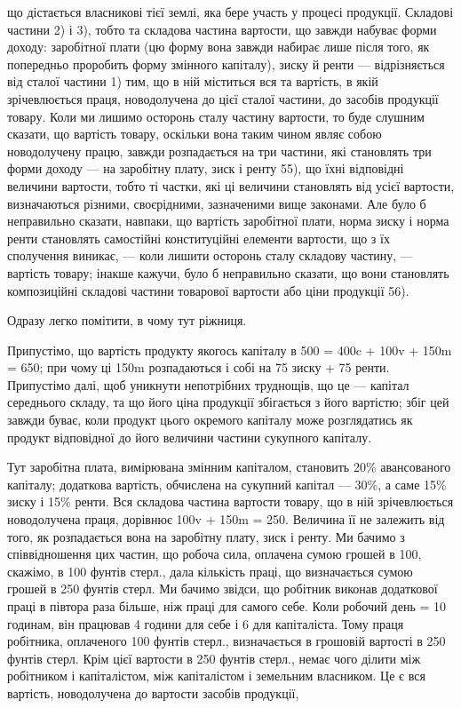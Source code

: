 що дістається власникові тієї землі, яка бере участь у процесі продукції. Складові
частини 2) і 3), тобто та складова частина вартости, що завжди набуває
форми доходу: заробітної плати (цю форму вона завжди набирає лише після
того, як попередньо проробить форму змінного капіталу), зиску й ренти —
відрізняється від сталої частини 1) тим, що в ній міститься вся та вартість, в
якій зрічевлюється праця, новодолучена до цієї сталої частини, до засобів продукції
товару. Коли ми лишимо осторонь сталу частину вартости, то буде слушним
сказати, що вартість товару, оскільки вона таким чином являє собою новодолучену
працю, завжди розпадається на три частини, які становлять три форми
доходу — на заробітну плату, зиск і ренту 55), що їхні відповідні величини вартости,
тобто ті частки, які ці величини становлять від усієї вартости, визначаються
різними, своєрідними, зазначеними вище законами. Але було б неправильно
сказати, навпаки, що вартість заробітної плати, норма зиску і норма ренти
становлять самостійні конституційні елементи вартости, що з їх сполучення виникає,
— коли лишити осторонь сталу складову частину, — вартість товару; інакше
кажучи, було б неправильно сказати, що вони становлять композиційні складові
частини товарової вартости або ціни продукції 56).

Одразу легко помітити, в чому тут ріжниця.

Припустімо, що вартість продукту якогось капіталу в 500 = 400c +
100v + 150m = 650; при чому ці 150m розпадаються і собі на 75 зиску +
75 ренти. Припустімо далі, щоб уникнути непотрібних труднощів, що це —
капітал середнього складу, та що його ціна продукції збігається з його вартістю;
збіг цей завжди буває, коли продукт цього окремого капіталу може розглядатись
як продукт відповідної до його величини частини сукупного капіталу.

Тут заробітна плата, вимірювана змінним капіталом, становить 20\% авансованого
капіталу; додаткова вартість, обчислена на сукупний капітал — 30\%,
а саме 15\% зиску і 15\% ренти. Вся складова частина вартости товару, що
в ній зрічевлюється новодолучена праця, дорівнює 100v + 150m = 250. Величина
її не залежить від того, як розпадається вона на заробітну плату, зиск і ренту.
Ми бачимо з співвідношення цих частин, що робоча сила, оплачена сумою
грошей в 100, скажімо, в 100 фунтів стерл., дала кількість праці, що визначається
сумою грошей в 250 фунтів стерл. Ми бачимо звідси, що робітник
виконав додаткової праці в півтора раза більше, ніж праці для самого себе.
Коли робочий день = 10 годинам, він працював 4 години для себе і 6 для
капіталіста. Тому праця робітника, оплаченого 100 фунтів стерл., визначається
в грошовій вартості в 250 фунтів стерл. Крім цієї вартости в 250 фунтів стерл.,
немає чого ділити між робітником і капіталістом, між капіталістом і земельним
власником. Це є вся вартість, новодолучена до вартости засобів продукції,

